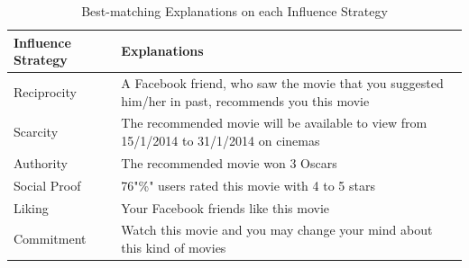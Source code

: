 \begin{table}[ht]
	\centering %
	\begin{tabular}{p{2cm} p{12cm}}  %
		\hline\hline %
		Influence Strategy & Explanations \\ %
		\hline %
		Reciprocity & A Facebook friend, who saw the movie that you suggested him/her in past, recommends you this movie \\ %
		Scarcity & The recommended movie will be available to view from 15/1/2014 to 31/1/2014 on cinemas \\
		Authority & The recommended movie won 3 Oscars\\
		Social Proof & 76"\%" users rated this movie with 4 to 5 stars\\
		Liking & Your Facebook friends like this movie \\
		Commitment & Watch this movie and you may change your mind about this kind of movies\\ [1ex] %
		\hline %
	\end{tabular}
	\caption{Best-matching Explanations on each Influence Strategy}
	\label{table:best-matching-explanations}
\end{table}



